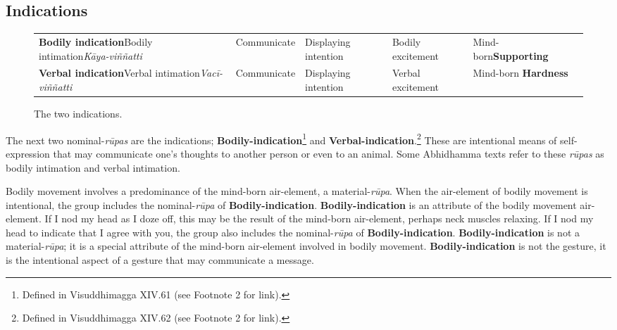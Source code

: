 \subsection*{Indications}

\begin{figure} [H]
\setlength{\tabcolsep}{0pt}
\renewcommand{\arraystretch}{1.1}
\noindent\begin{tabular}{P{0.25\textwidth} | C{.185\textwidth} C{0.185\textwidth} C{0.185\textwidth} C{0.195\textwidth} m{0mm}}
\toprule
 &  &  &  & \\
\midrule
\textbf{Bodily indication}\newline Bodily intimation\newline \textit{Kāya-viññatti} & Communicate & Displaying intention & Bodily excitement & Mind-born\newline \textbf{Supporting} &\\[12mm]
\textbf{Verbal indication}\newline Verbal intimation\newline \textit{Vacī-viññatti} & Communicate & Displaying intention & Verbal excitement & Mind-born \textbf{Hardness} &\\[12mm]
\bottomrule
\end{tabular}
\caption[]{The two indications.\footnotemark}
\end{figure}


The next two nominal-\textit{rūpas} are the indications; \textbf{Bodily-indication}\footnote{Defined in Visuddhimagga XIV.61 (see Footnote 2 for link).} and \textbf{Verbal-indication}.\footnote{Defined in Visuddhimagga XIV.62 (see Footnote 2 for link).} These are intentional means of self-expression that may communicate one’s thoughts to another person or even to an animal. Some Abhidhamma texts refer to these \textit{rūpas} as bodily intimation and verbal intimation.

Bodily movement involves a predominance of the mind-born air-element, a material-\textit{rūpa}. When the air-element of bodily movement is intentional, the group includes the nominal-\textit{rūpa} of \textbf{Bodily-indication}. \textbf{Bodily-indication} is an attribute of the bodily movement air-element. If I nod my head as I doze off, this may be the result of the mind-born air-element, perhaps neck muscles relaxing. If I nod my head to indicate that I agree with you, the group also includes the nominal-\textit{rūpa} of \textbf{Bodily-indication}. \textbf{Bodily-indication} is not a material-\textit{rūpa}; it is a special attribute of the mind-born air-element involved in bodily movement. \textbf{Bodily-indication} is not the gesture, it is the intentional aspect of a gesture that may communicate a message.

